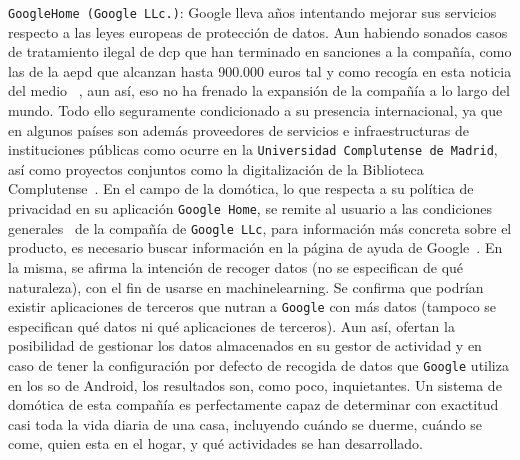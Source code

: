 \verb|GoogleHome (Google LLc.)|: Google lleva años intentando mejorar sus servicios respecto a las leyes europeas de protección de datos. Aun habiendo sonados casos de tratamiento ilegal de \gls{dcp} que han terminado en sanciones a la compañía, como las de la \gls{aepd} que alcanzan hasta 900.000 euros tal y como recogía en esta noticia del medio ~\cite{j.m.sanchez_2014}, aun así, eso no ha frenado la expansión de la compañía a lo largo del mundo. Todo ello seguramente condicionado a su presencia internacional, ya que en algunos países son además proveedores de servicios e infraestructuras de instituciones públicas como ocurre en la \verb|Universidad Complutense de Madrid|, así como proyectos conjuntos como la digitalización de la Biblioteca Complutense~\cite{bibliotecaucmgoogle8}. En el campo de la domótica, lo que respecta a su política de privacidad en su aplicación \verb|Google Home|, se remite al usuario a las condiciones generales~\cite{googleprivacy} de la compañía de \verb|Google LLc|, para información más concreta sobre el producto, es necesario buscar información en la página de ayuda de Google~\cite{googlenestsecurityandprivacy}. En la misma, se afirma la intención de recoger datos (no se especifican de qué naturaleza), con el fin de usarse en \gls{machinelearning}. Se confirma que podrían existir aplicaciones de terceros que nutran a \verb|Google| con más datos (tampoco se especifican qué datos ni qué aplicaciones de terceros). Aun así, ofertan la posibilidad de gestionar los datos almacenados en su gestor de actividad y en caso de tener la configuración por defecto de recogida de datos que \verb|Google| utiliza en los \gls{so} de Android, los resultados son, como poco, inquietantes. Un sistema de domótica de esta compañía es perfectamente capaz de determinar con exactitud casi toda la vida diaria de una casa, incluyendo cuándo se duerme, cuándo se come, quien esta en el hogar, y qué actividades se han desarrollado.

\vspace{1cm}

